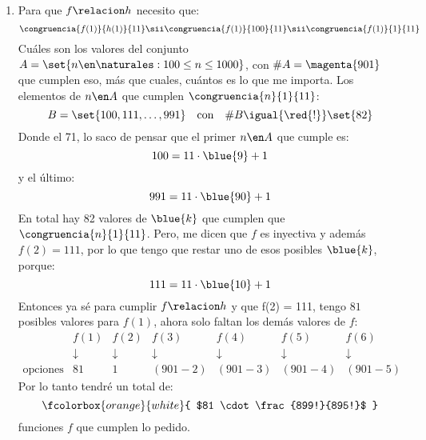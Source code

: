 \begin{enumerate}[label=\alph*)]
	\item
	      Para que $f \relacion h$ necesito que:
	      $$
		      \congruencia{f(1)}{h(1)}{11}
		      \sii
		      \congruencia{f(1)}{100}{11}
		      \sii
		      \congruencia{f(1)}{1}{11}
	      $$
	      Cuáles son los valores del conjunto $A = \set{n \en \naturales :  100 \leq n \leq 1000}$, con $\#A = \magenta{901}$ que cumplen eso, más que cuales,
	      cuántos es lo que me importa. Los elementos de $n \en A$ que cumplen $\congruencia{n}{1}{11}$:
	      $$
		      B = \set{100, 111, \dots, 991} \quad\text{con} \quad \#B \igual{\red{!}} \set{82}
	      $$
	      Donde el 71, lo saco de pensar que el primer $n \en A$ que cumple es:
	      $$
		      100 = 11 \cdot \blue{9} + 1
	      $$
	      y el último:
	      $$
		      991 = 11 \cdot \blue{90} + 1
	      $$
	      En total hay 82 valores de $\blue{k}$ que cumplen que $\congruencia{n}{1}{11}$. Pero, me dicen que $f$ es inyectiva y además
	      $f(2) = 111$, por lo que tengo que restar uno de esos posibles $\blue{k}$, porque:
	      $$
		      111 = 11 \cdot \blue{10} + 1
	      $$
	      Entonces ya sé para cumplir $f \relacion h$ y que f(2) = 111, tengo $81$ posibles valores para $f(1)$, ahora solo
	      faltan los demás valores de $f$:
	      $$
		      \begin{array}{ccccccc}
			                      & f(1)       & f(2)       & f(3)       & f(4)       & f(5)       & f(6)       \\
			                      & \downarrow & \downarrow & \downarrow & \downarrow & \downarrow & \downarrow \\
			      \text{opciones} & 81         & 1          & (901 - 2)  & (901 - 3)  & (901 - 4)  & (901 - 5)
		      \end{array}
	      $$
	      Por lo tanto tendré un total de:
	      $$
		      \fcolorbox{orange}{white}{
			      $81 \cdot \frac{899!}{895!}$
		      }
	      $$
	      funciones $f$ que cumplen lo pedido.
\end{enumerate}

\begin{aportes}
	\item {}
\end{aportes}
